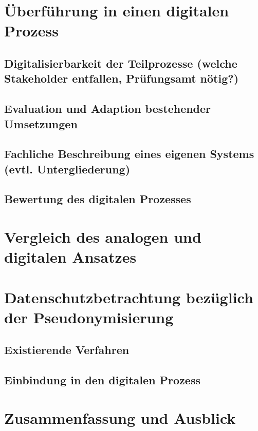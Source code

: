 \documentclass[ngerman]{tudscrreprt}
\begin{document}
\chapter{Überführung in einen digitalen Prozess}

\section{Digitalisierbarkeit der Teilprozesse (welche Stakeholder entfallen, Prüfungsamt nötig?)}

\section{Evaluation und Adaption bestehender Umsetzungen}

\section{Fachliche Beschreibung eines eigenen Systems (evtl. Untergliederung)}

\section{Bewertung des digitalen Prozesses}

\chapter{Vergleich des analogen und digitalen Ansatzes}

\chapter{Datenschutzbetrachtung bezüglich der Pseudonymisierung}

\section{Existierende Verfahren}

\section{Einbindung in den digitalen Prozess}

\chapter{Zusammenfassung und Ausblick}
\end{document}

